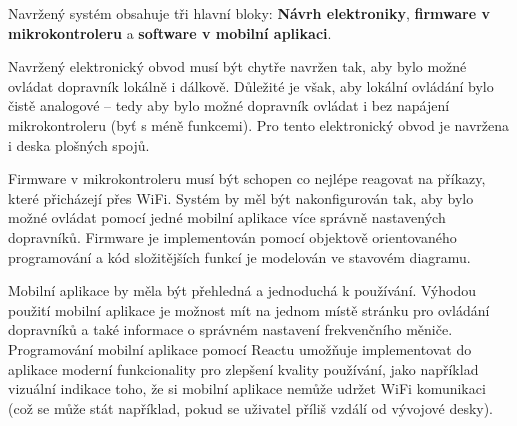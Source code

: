 Navržený systém obsahuje tři hlavní bloky: \textbf{Návrh elektroniky}, \textbf{firmware v mikrokontroleru} a \textbf{software v mobilní aplikaci}.

Navržený elektronický obvod musí být chytře navržen tak, aby bylo možné ovládat dopravník lokálně i dálkově. Důležité je však, aby lokální ovládání bylo čistě analogové – tedy aby bylo možné dopravník ovládat i bez napájení mikrokontroleru (byť s méně funkcemi). Pro tento elektronický obvod je navržena i deska plošných spojů.

Firmware v mikrokontroleru musí být schopen co nejlépe reagovat na příkazy, které přicházejí přes WiFi. Systém by měl být nakonfigurován tak, aby bylo možné ovládat pomocí jedné mobilní aplikace více správně nastavených dopravníků. Firmware je implementován pomocí objektově orientovaného programování a kód složitějších funkcí je modelován ve stavovém diagramu.

Mobilní aplikace by měla být přehledná a jednoduchá k používání. Výhodou použití mobilní aplikace je možnost mít na jednom místě stránku pro ovládání dopravníků a také informace o správném nastavení frekvenčního měniče. Programování mobilní aplikace pomocí Reactu umožňuje implementovat do aplikace moderní funkcionality pro zlepšení kvality používání, jako například vizuální indikace toho, že si mobilní aplikace nemůže udržet WiFi komunikaci (což se může stát například, pokud se uživatel příliš vzdálí od vývojové desky).

%
%
